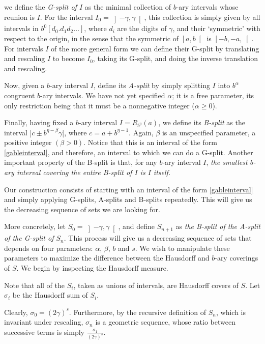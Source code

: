 \documentclass[11pt, reqno]{amsart}
\begin{document}
we define the \emph{G-split of $I$} as the minimal collection of $b$-ary intervals whose reunion is $I$. For the interval $I_0 = \left]-\gamma, \gamma\right[$, this collection is simply given by all intervals in $b^0 [ d_0 . d_1 d_2 \dots ]$, where $d_i$ are the digits of $\gamma$, and their `symmetric' with respect to the origin, in the sense that the symmetric of $\left[a,b\right[$ is $\left[-b,-a,\right[$. For intervals $I$ of the more general form we can define their G-split by translating and rescaling $I$ to become $I_0$, taking its G-split, and doing the inverse translation and rescaling.

Now, given a $b$-ary interval $I$, define its \emph{A-split} by simply splitting $I$ into $b^\alpha$ congruent $b$-ary intervals. We have not yet specified $\alpha$; it is a free parameter, its only restriction being that it must be a nonnegative integer ($\alpha \geq 0$).

Finally, having fixed a $b$-ary interval $I = R_{b^\eta}(a)$, we define its \emph{B-split} as the interval $]c \pm b^{\eta - \beta} \gamma[$, where $c = a + b^{\eta - 1}$. Again, $\beta$ is an unspecified parameter, a positive integer $(\beta > 0)$. Notice that this is an interval of the form \eqref{gableinterval}, and therefore, an interval to which we can do a G-split. Another important property of the B-split is that, for any $b$-ary interval $I$, \emph{the smallest $b$-ary interval covering the entire B-split of $I$ is $I$ itself.}

Our construction consists of starting with an interval of the form \eqref{gableinterval} and simply applying G-splits, A-splits and B-splits repeatedly. This will give us the decreasing sequence of sets we are looking for.

More concretely, let $S_0 = \left]-\gamma, \gamma\right[$, and define $S_{n+1}$ as \emph{the B-split of the A-split of the G-split of $S_n$}. This process will give us a decreasing sequence of sets that depends on four parameters: $\alpha$, $\beta$, $b$ and $s$. We wish to manipulate these parameters to maximize the difference between the Hausdorff and $b$-ary coverings of $S$. We begin by inspecting the Hausdorff measure.

Note that all of the $S_i$, taken as unions of intervals, are Hausdorff covers of $S$. Let $\sigma_i$ be the Hausdorff sum of $S_i$.

Clearly, $\sigma_0 = (2 \gamma)^s$. Furthermore, by the recursive definition of $S_n$, which is invariant under rescaling, $\sigma_n$ is a geometric sequence, whose ratio between successive terms is simply $\frac{\sigma_1}{(2 \gamma)^s}$.
\end{document}

